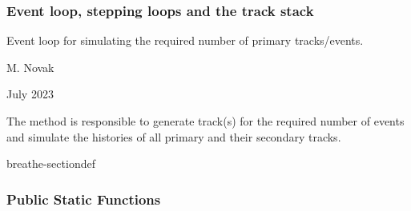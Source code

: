 \documentclass[letterpaper,10pt,english]{sphinxmanual}
\begin{document}
\subsubsection{Event loop, stepping loops and the track stack}
\label{\detokenize{Simulation/SimulationCodeDoc:event-loop-stepping-loops-and-the-track-stack}}

\begin{fulllineitems}
\label{\detokenize{Simulation/SimulationCodeDoc:_CPPv49EventLoop}}
\pysigstartsignatures
\pysigstartmultiline
{}
\pysigstopmultiline
\pysigstopsignatures
\sphinxAtStartPar
Event loop for simulating the required number of primary tracks/events. 

\sphinxAtStartPar
\begin{description}
\sphinxAtStartPar
M. Novak 

\sphinxAtStartPar
July 2023

\end{description}


\sphinxAtStartPar
The  method is responsible to generate track(s) for the required number of events and simulate the histories of all primary and their secondary tracks. 

\begin{sphinxuseclass}{breathe-sectiondef}\subsubsection*{Public Static Functions}


\end{sphinxuseclass}
\end{fulllineitems}
\end{document}
